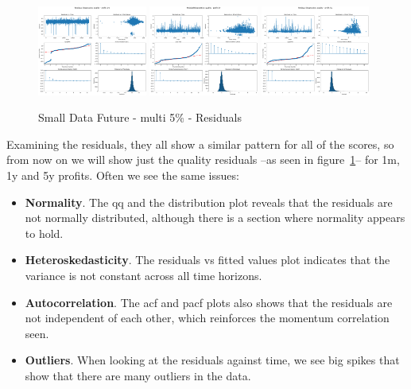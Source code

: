 \documentclass[11pt,english,a4paper,hidelinks]{book}
\begin{document}
\begin{figure}[H]
    \centering
    \includegraphics[width=0.32\textwidth]{images/code/models/linear_regression/first_model/Multi/quality_profit_1m_residuals.png}
    \includegraphics[width=0.32\textwidth]{images/code/models/linear_regression/first_model/Multi/quality_profit_1y_residuals.png}
    \includegraphics[width=0.32\textwidth]{images/code/models/linear_regression/first_model/Multi/quality_profit_5y_residuals.png}
    \caption{Small Data Future - \acrshort{multi} 5\% - Residuals}
    \label{fig:first_linear_regression_residuals}
\end{figure}

\noindent Examining the residuals, they all show a similar pattern for all of the scores, so from now on we will show just the quality residuals --as seen in figure~\ref{fig:first_linear_regression_residuals}-- for 1m, 1y and 5y profits. Often we see the same issues:
\begin{itemize}
    \item \textbf{Normality}. The \acrshort{qq} and the distribution plot reveals that the residuals are not normally distributed, although there is a section where normality appears to hold.
    \item \textbf{Heteroskedasticity}. The residuals vs fitted values plot indicates that the variance is not constant across all time horizons.
    \item \textbf{Autocorrelation}. The \acrshort{acf} and \acrshort{pacf} plots also shows that the residuals are not independent of each other, which reinforces the momentum correlation seen.
    \item \textbf{Outliers}. When looking at the residuals against time, we see big spikes that show that there are many outliers in the data.
\end{itemize}
\end{document}
